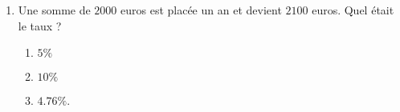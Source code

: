 \begin{exercice}
\begin{multicols}{2}
\begin{enumerate}
    \item
        Une somme de \( 2000\) euros est placée un an et devient \( 2100\) euros. Quel était le taux ?
        \begin{enumerate}
            \item
                \( 5\%\)
            \item
                \( 10\%\)
            \item
                \( 4.76\%\).
        \end{enumerate}

    \end{enumerate}
    \end{multicols}
        
\end{exercice}
